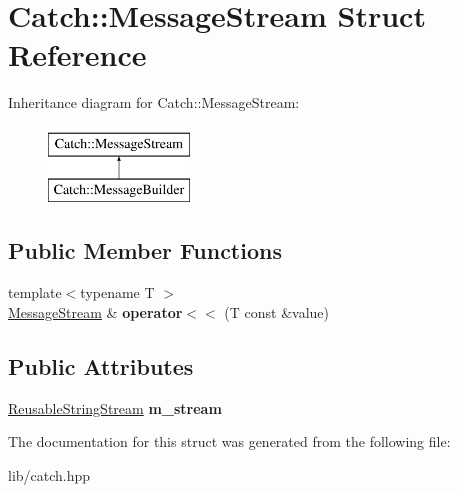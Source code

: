 \hypertarget{struct_catch_1_1_message_stream}{}\section{Catch\+:\+:Message\+Stream Struct Reference}
\label{struct_catch_1_1_message_stream}
Inheritance diagram for Catch\+:\+:Message\+Stream\+:\begin{figure}[H]
\begin{center}
\leavevmode
\includegraphics[height=2.000000cm]{struct_catch_1_1_message_stream}
\end{center}
\end{figure}
\subsection*{Public Member Functions}
\begin{DoxyCompactItemize}
\item 
\mbox{\label{struct_catch_1_1_message_stream_a554c4aff5925a077e9fe9d858217428d}} 
{\footnotesize template$<$typename T $>$ }\\\mbox{\hyperlink{struct_catch_1_1_message_stream}{Message\+Stream}} \& {\bfseries operator$<$$<$} (T const \&value)
\end{DoxyCompactItemize}
\subsection*{Public Attributes}
\begin{DoxyCompactItemize}
\item 
\mbox{\label{struct_catch_1_1_message_stream_a9202520faed8882ef469db9f353ec578}} 
\mbox{\hyperlink{class_catch_1_1_reusable_string_stream}{Reusable\+String\+Stream}} {\bfseries m\+\_\+stream}
\end{DoxyCompactItemize}


The documentation for this struct was generated from the following file\+:\begin{DoxyCompactItemize}
\item 
lib/catch.\+hpp\end{DoxyCompactItemize}
